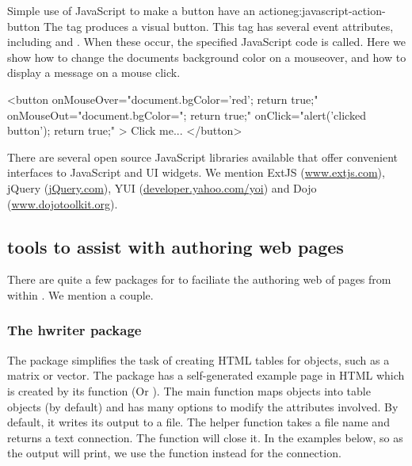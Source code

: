 \begin{example}{Simple use of JavaScript to make a button have an action}{eg:javascript-action-button}
  The  tag produces a visual button. This tag has several
  event attributes, including  and
  . When these occur, the specified
  JavaScript code is called. Here we show how to change the documents background
  color on a mouseover, and how to display a message on a mouse click.
  \begin{HTMLinput}
<button
  onMouseOver="document.bgColor='red'; return true;"
  onMouseOut="document.bgColor="; return true;"
  onClick="alert('clicked button'); return true;" >
  Click me...
</button>
 \end{HTMLinput}
\end{example}

There are several open source JavaScript libraries available that
offer convenient interfaces to JavaScript and UI widgets. We
mention ExtJS (\url{www.extjs.com}), jQuery (\url{jQuery.com}), YUI
(\url{developer.yahoo.com/yoi}) and Dojo
(\url{www.dojotoolkit.org}). 


\subsection{\R\/ tools to assist with authoring web pages}
\label{sec:r-tools-authoring}

There are quite a few packages for \R\/ to faciliate the authoring web
of pages from within
\R. We mention a couple.

\subsubsection{The hwriter package}
\label{sec:hwriter-package}


The  package simplifies the task of creating HTML tables
for \R\/ objects, such as a matrix or vector. The package has a
self-generated example page in HTML which is created by its
 function (Or ). The main
function  maps \R\/ objects into table objects (by
default) and has many options to modify the attributes involved. By
default, it writes its output to a file. The helper function
 takes a file name and returns a text
connection. The  function will close it. In the
examples below, so as the output will print, we use the
 function instead for the connection.

